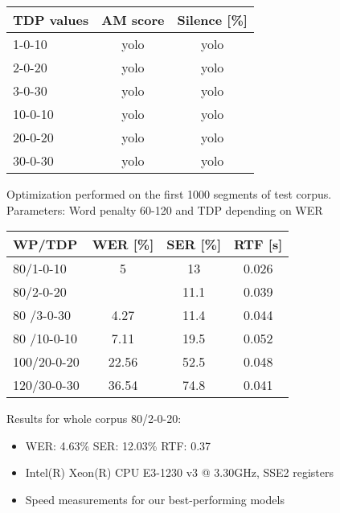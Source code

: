 \documentclass[11pt, a4paper, landscape]{article}
\begin{document}
\begin{center}
\begin{tabular}{| l |  c | c |} \toprule
  TDP values & AM score     & Silence [\%] \\ \midrule
  1-0-10     & yolo         & yolo         \\
  2-0-20     & yolo         & yolo         \\
  3-0-30     & \alert{yolo} & \alert{yolo} \\ \midrule
  10-0-10    & yolo         & yolo         \\
  20-0-20    & yolo         & yolo         \\
  30-0-30    & yolo         & yolo         \\ \bottomrule
\end{tabular}
\end{center}
\vfill


\NewPage{}
\vfill
Optimization performed on the first 1000 segments of test corpus.\\
Parameters: Word penalty 60-120 and TDP depending on WER\\
\begin{center}
	\begin{tabular}{| l | c | c | c |} \toprule
		WP/TDP      &    WER [\%]    & SER [\%]    & RTF [s]    \\ \midrule
		80/1-0-10   &    5           &    13       & 0.026      \\
		80/2-0-20   &\color{red}{4.2}&    11.1     & 0.039      \\
		80 /3-0-30  &    4.27        &    11.4     & 0.044      \\ \midrule
		80 /10-0-10 &    7.11        &    19.5     & 0.052      \\
		100/20-0-20 &    22.56       &    52.5     & 0.048      \\
		120/30-0-30 &    36.54       &    74.8     & 0.041      \\ \bottomrule
		
	\end{tabular}
\end{center}
Results for whole corpus 80/2-0-20:
\begin{itemize}
	\item WER: 4.63\% SER: 12.03\%  RTF: 0.37
\end{itemize}
\vfill

\NewPage{}
\vfill
\begin{itemize}
  \item Intel(R) Xeon(R) CPU E3-1230 v3 @ 3.30GHz, SSE2 registers
  \item Speed measurements for our best-performing models
\end{itemize}
\end{document}

